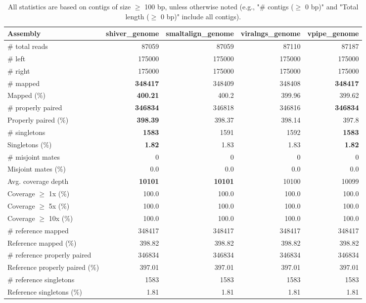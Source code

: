 \documentclass[12pt,a4paper]{article}
\begin{document}
\begin{table}[ht]
\begin{center}
\caption{All statistics are based on contigs of size $\geq$ 100 bp, unless otherwise noted (e.g., "\# contigs ($\geq$ 0 bp)" and "Total length ($\geq$ 0 bp)" include all contigs).}
\begin{tabular}{|l*{4}{|r}|}
\hline
Assembly & shiver\_genome & smaltalign\_genome & viralngs\_genome & vpipe\_genome \\ \hline
\# total reads & 87059 & 87059 & 87110 & 87187 \\ \hline
\# left & 175000 & 175000 & 175000 & 175000 \\ \hline
\# right & 175000 & 175000 & 175000 & 175000 \\ \hline
\# mapped & {\bf 348417} & 348409 & 348408 & {\bf 348417} \\ \hline
Mapped (\%) & {\bf 400.21} & 400.2 & 399.96 & 399.62 \\ \hline
\# properly paired & {\bf 346834} & 346818 & 346816 & {\bf 346834} \\ \hline
Properly paired (\%) & {\bf 398.39} & 398.37 & 398.14 & 397.8 \\ \hline
\# singletons & {\bf 1583} & 1591 & 1592 & {\bf 1583} \\ \hline
Singletons (\%) & {\bf 1.82} & 1.83 & 1.83 & {\bf 1.82} \\ \hline
\# misjoint mates & 0 & 0 & 0 & 0 \\ \hline
Misjoint mates (\%) & 0.0 & 0.0 & 0.0 & 0.0 \\ \hline
Avg. coverage depth & {\bf 10101} & {\bf 10101} & 10100 & 10099 \\ \hline
Coverage $\geq$ 1x (\%) & 100.0 & 100.0 & 100.0 & 100.0 \\ \hline
Coverage $\geq$ 5x (\%) & 100.0 & 100.0 & 100.0 & 100.0 \\ \hline
Coverage $\geq$ 10x (\%) & 100.0 & 100.0 & 100.0 & 100.0 \\ \hline
\# reference mapped & 348417 & 348417 & 348417 & 348417 \\ \hline
Reference mapped (\%) & 398.82 & 398.82 & 398.82 & 398.82 \\ \hline
\# reference properly paired & 346834 & 346834 & 346834 & 346834 \\ \hline
Reference properly paired (\%) & 397.01 & 397.01 & 397.01 & 397.01 \\ \hline
\# reference singletons & 1583 & 1583 & 1583 & 1583 \\ \hline
Reference singletons (\%) & 1.81 & 1.81 & 1.81 & 1.81 \\ \hline

\end{tabular}
\end{center}
\end{table}
\end{document}
